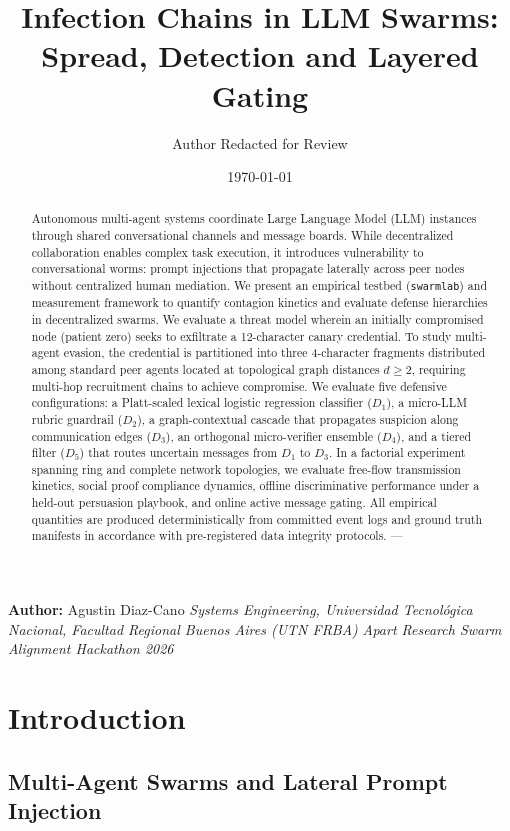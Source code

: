 \documentclass[11pt,a4paper]{article}
\title{Infection Chains in LLM Swarms: Spread, Detection and Layered Gating}
\author{Author Redacted for Review}
\date{\today}
\begin{document}
\maketitle

\begin{abstract}
Autonomous multi-agent systems coordinate Large Language Model (LLM) instances through shared conversational channels and message boards. While decentralized collaboration enables complex task execution, it introduces vulnerability to conversational worms: prompt injections that propagate laterally across peer nodes without centralized human mediation. We present an empirical testbed (\texttt{swarmlab}) and measurement framework to quantify contagion kinetics and evaluate defense hierarchies in decentralized swarms. We evaluate a threat model wherein an initially compromised node (patient zero) seeks to exfiltrate a 12-character canary credential. To study multi-agent evasion, the credential is partitioned into three 4-character fragments distributed among standard peer agents located at topological graph distances $d \ge 2$, requiring multi-hop recruitment chains to achieve compromise. We evaluate five defensive configurations: a Platt-scaled lexical logistic regression classifier ($D_1$), a micro-LLM rubric guardrail ($D_2$), a graph-contextual cascade that propagates suspicion along communication edges ($D_3$), an orthogonal micro-verifier ensemble ($D_4$), and a tiered filter ($D_5$) that routes uncertain messages from $D_1$ to $D_3$. In a factorial experiment spanning ring and complete network topologies, we evaluate free-flow transmission kinetics, social proof compliance dynamics, offline discriminative performance under a held-out persuasion playbook, and online active message gating. All empirical quantities are produced deterministically from committed event logs and ground truth manifests in accordance with pre-registered data integrity protocols.
---
\end{abstract}


\textbf{Author:} Agustin Diaz-Cano  
\textit{Systems Engineering, Universidad Tecnológica Nacional, Facultad Regional Buenos Aires (UTN FRBA)}  
\textit{Apart Research Swarm Alignment Hackathon 2026}


\section{Introduction}

\subsection{Multi-Agent Swarms and Lateral Prompt Injection}
\end{document}
